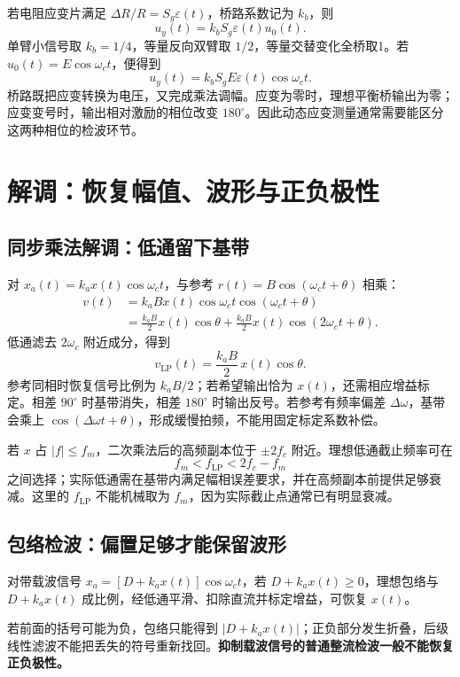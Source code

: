 若电阻应变片满足 $\Delta R/R=S_g\varepsilon(t)$，桥路系数记为 $k_b$，则
\[
u_y(t)=k_bS_g\varepsilon(t)u_0(t).
\]
单臂小信号取 $k_b=1/4$，等量反向双臂取 $1/2$，等量交替变化全桥取1。若 $u_0(t)=E\cos\omega_ct$，便得到
\[
\boxed{u_y(t)=k_bS_gE\varepsilon(t)\cos\omega_ct}.
\]
桥路既把应变转换为电压，又完成乘法调幅。应变为零时，理想平衡桥输出为零；应变变号时，输出相对激励的相位改变 $180^\circ$。因此动态应变测量通常需要能区分这两种相位的检波环节。

\clearpage
\section{解调：恢复幅值、波形与正负极性}
\label{sec:ch5-demodulation}

\subsection{同步乘法解调：低通留下基带}
\noindent{}

对 $x_a(t)=k_ax(t)\cos\omega_ct$，与参考 $r(t)=B\cos(\omega_ct+\theta)$ 相乘：
\begin{align*}
v(t)&=k_aBx(t)\cos\omega_ct\cos(\omega_ct+\theta)\\
&=\frac{k_aB}{2}x(t)\cos\theta
+\frac{k_aB}{2}x(t)\cos(2\omega_ct+\theta).
\end{align*}
低通滤去 $2\omega_c$ 附近成分，得到
\[
\boxed{v_{\mathrm{LP}}(t)=\frac{k_aB}{2}\,x(t)\cos\theta}.
\]
参考同相时恢复信号比例为 $k_aB/2$；若希望输出恰为 $x(t)$，还需相应增益标定。相差 $90^\circ$ 时基带消失，相差 $180^\circ$ 时输出反号。若参考有频率偏差 $\Delta\omega$，基带会乘上 $\cos(\Delta\omega t+\theta)$，形成缓慢拍频，不能用固定标定系数补偿。

若 $x$ 占 $|f|\leq f_m$，二次乘法后的高频副本位于 $\pm2f_c$ 附近。理想低通截止频率可在
\[
f_m<f_{\mathrm{LP}}<2f_c-f_m
\]
之间选择；实际低通需在基带内满足幅相误差要求，并在高频副本前提供足够衰减。这里的 $f_{\mathrm{LP}}$ 不能机械取为 $f_m$，因为实际截止点通常已有明显衰减。

\subsection{包络检波：偏置足够才能保留波形}

对带载波信号 $x_a=[D+k_ax(t)]\cos\omega_ct$，若 $D+k_ax(t)\geq0$，理想包络与 $D+k_ax(t)$ 成比例，经低通平滑、扣除直流并标定增益，可恢复 $x(t)$。

若前面的括号可能为负，包络只能得到 $|D+k_ax(t)|$；正负部分发生折叠，后级线性滤波不能把丢失的符号重新找回。\textbf{抑制载波信号的普通整流检波一般不能恢复正负极性。}

